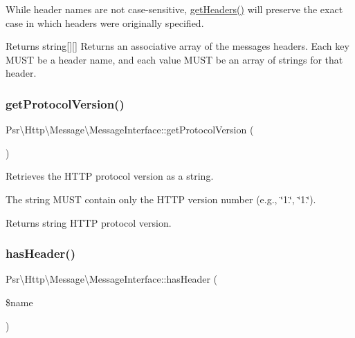 While header names are not case-\/sensitive, \hyperlink{interfacePsr_1_1Http_1_1Message_1_1MessageInterface_a510ab87eb5cce38a8bb4cbec8f3f7565}{get\+Headers()} will preserve the exact case in which headers were originally specified.

\begin{DoxyReturn}{Returns}
string\mbox{[}\mbox{]}\mbox{[}\mbox{]} Returns an associative array of the message\textquotesingle{}s headers. Each key M\+U\+ST be a header name, and each value M\+U\+ST be an array of strings for that header. 
\end{DoxyReturn}
\mbox{\label{interfacePsr_1_1Http_1_1Message_1_1MessageInterface_af9eb3a7d44050ba1b4792c0332635121}} 
\subsubsection{\texorpdfstring{get\+Protocol\+Version()}{getProtocolVersion()}}
{\footnotesize\ttfamily Psr\textbackslash{}\+Http\textbackslash{}\+Message\textbackslash{}\+Message\+Interface\+::get\+Protocol\+Version (\begin{DoxyParamCaption}{ }\end{DoxyParamCaption})}

Retrieves the H\+T\+TP protocol version as a string.

The string M\+U\+ST contain only the H\+T\+TP version number (e.\+g., \char`\"{}1.\char`\"{}, \char`\"{}1.\char`\"{}).

\begin{DoxyReturn}{Returns}
string H\+T\+TP protocol version. 
\end{DoxyReturn}
\mbox{\label{interfacePsr_1_1Http_1_1Message_1_1MessageInterface_ab0dd1286bce947f7bd29d36df09b4c12}} 
\subsubsection{\texorpdfstring{has\+Header()}{hasHeader()}}
{\footnotesize\ttfamily Psr\textbackslash{}\+Http\textbackslash{}\+Message\textbackslash{}\+Message\+Interface\+::has\+Header (\begin{DoxyParamCaption}\item[{}]{\$name }\end{DoxyParamCaption})}

